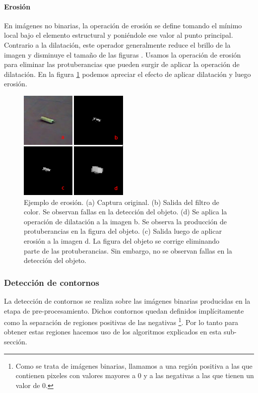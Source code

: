 	\paragraph{Erosi\'on}
En im\'agenes no binarias, la operaci\'on de erosi\'on se define tomando el m\'inimo local bajo el elemento estructural y poni\'endole ese valor al punto principal. Contrario a la dilataci\'on, este operador generalmente reduce el brillo de la imagen y disminuye el tama\~no de las figuras \cite{nasa-dilate-erode}. Usamos la operaci\'on de erosi\'on para eliminar las protuberancias que pueden surgir de aplicar la operaci\'on de dilataci\'on. En la figura \ref{fig:erode} podemos apreciar el efecto de aplicar dilataci\'on y luego erosi\'on.

\begin{figure}[tpb]
\begin{center}
  \includegraphics[scale=0.8]{vision/figures/erosion.png}
\end{center}
  \caption[Ejemplo de erosi\'on]{\small Ejemplo de erosi\'on. (a) Captura original. (b) Salida del filtro de color. Se observan fallas en la detecci\'on del objeto. (d) Se aplica la operaci\'on de dilataci\'on a la imagen b. Se observa la producci\'on de protuberancias en la figura del objeto. (c) Salida luego de aplicar erosi\'on a la imagen d. La figura del objeto se corrige eliminando parte de las protuberancias. Sin embargo, no se observan fallas en la detecci\'on del objeto. }
  \label{fig:erode}
\end{figure}

	\subsubsection{Detecci\'on de contornos}
	La detecci\'on de contornos se realiza sobre las im\'agenes binarias producidas en la etapa de pre-procesamiento. Dichos contornos
	quedan definidos impl\'icitamente como la separaci\'on de regiones 
	positivas de las negativas \footnote{ Como se trata de im\'agenes 
	binarias, llamamos a una regi\'on positiva a las que contienen 
	pixeles con valores mayores a 0 y a las negativas a las que tienen 
	un valor de 0.}. Por lo tanto para obtener estas regiones hacemos 
	uso de los algoritmos explicados en esta sub-secci\'on.
	
